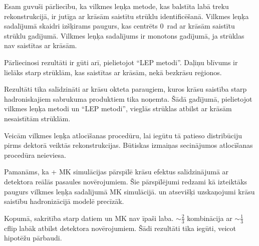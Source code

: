 Esam guvuši pārliecību, ka vilkmes leņķa metode, kas balstīta labā treku rekonstrukcijā, ir jutīga ar krāsām saistītu strūklu identificēšanā. Vilkmes leņķa sadalījumā skaidri izšķirams paugurs, kas centrēts 0~rad ar krāsām saistītu strūklu gadījumā. Vilkmes leņķa sadalījums ir monotons gadījumā, ja strūklas nav saistītas ar krāsām.

Pārliecinosi rezultāti ir gūti arī, pielietojot ``LEP metodi''. Daļiņu blīvums ir lielāks starp strūklām, kas saistītas ar krāsām, nekā bezkrāsu reģionos. 

Rezultāti tika salīdzināti ar krāsu okteta \PW paraugiem, kuros krāsu saistība starp hadroniskajiem sabrukuma produktiem tika noņemta. Šādā gadījumā, pielietojot vilkmes leņķa metodi un ``LEP metodi'', vieglās strūklas atbilst ar krāsām nesaistītām strūklām. 

Veicām vilkmes leņķa atlocīšanas procedūru, lai iegūtu tā patieso distribūciju pirms dektorā veiktās rekonstrukcijas. Būtiskas izmaiņas secinājumos atlocīšanas procedūra neieviesa.

Pamanāms, ka \POWHEG + \PYTHIA MK simulācijas pārspīlē krāsu efektus salīdzinājumā ar detektora reālās pasaules novērojumiem. Šie pārspīlējumi redzami kā izteiktāks paugurs vilkmes leņķa sadalījumā MK simulācijā. \HERWIGpp un atsevišķi \PYTHIA uzskaņojumi krāsu saistību hadronizācijā modelē precīzāk.

Kopumā, sakritība starp datiem un MK nav īpaši laba. $\sim\frac{2}{3}$ \ttbar kombinācija ar $\sim\frac{1}{3}$ \ttbar cflip labāk atbilst detektora novērojumiem. Šādi rezultāti tika iegūti, veicot hipotēžu pārbaudi.

